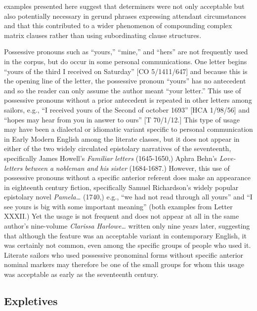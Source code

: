 examples presented here suggest that determiners were not only acceptable but also potentially necessary in gerund phrases expressing attendant circumstances and that this contributed to a wider phenomenon of compounding complex matrix clauses rather than using subordinating clause structures.

  Possessive pronouns such as “yours,” “mine,” and “hers” are not frequently used in the corpus, but do occur in some personal communications. One letter begins “yours of the third I received on Saturday” [CO 5/1411/647] and because this is the opening line of the letter, the possessive pronoun “yours” has no antecedent and so the reader can only assume the author meant “your letter.” This use of possessive pronouns without a prior antecedent is repeated in other letters among sailors, e.g., “I received yours of the Second of october 1693” [HCA 1/98/56] and “hopes may hear from you in answer to ours” [T 70/1/12.] This type of usage may have been a dialectal or idiomatic variant specific to personal communication in Early Modern English among the literate classes, but it does not appear in either of the two widely circulated epistolary narratives of the seventeenth, specifically James Howell’s \textit{Familiar} \textit{letters} (1645-1650,) Aphra Behn’s \textit{Love-letters} \textit{between} \textit{a} \textit{nobleman} \textit{and} \textit{his} \textit{sister} (1684-1687.) However, this use of possessive pronouns without a specific anterior referent does make an appearance in eighteenth century fiction, specifically Samuel Richardson’s widely popular epistolary novel \textit{Pamela…} (1740,) e.g., “we had not read through all yours” and “I see yours is big with some important meaning” (both examples from Letter XXXII.) Yet the usage is not frequent and does not appear at all in the same author’s nine-volume \textit{Clarissa} \textit{Harlowe…} written only nine years later, suggesting that although the feature was an acceptable variant in contemporary English, it was certainly not common, even among the specific groups of people who used it. Literate sailors who used possessive pronominal forms without specific anterior nominal markers may therefore be one of the small groups for whom this usage was acceptable as early as the seventeenth century. 

\subsection{\textbf{Expletives}}%

